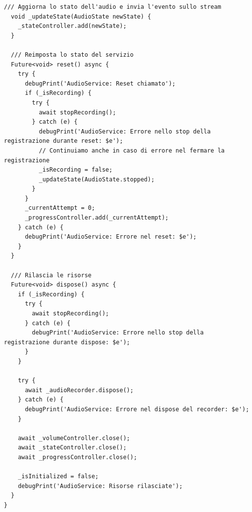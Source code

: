 \documentclass[14pt]{extbook}
\begin{document}
\begin{lstlisting}[caption=audio\_service.dart, label=lst:AudioService]
  /// Aggiorna lo stato dell'audio e invia l'evento sullo stream
  void _updateState(AudioState newState) {
    _stateController.add(newState);
  }

  /// Reimposta lo stato del servizio
  Future<void> reset() async {
    try {
      debugPrint('AudioService: Reset chiamato');
      if (_isRecording) {
        try {
          await stopRecording();
        } catch (e) {
          debugPrint('AudioService: Errore nello stop della registrazione durante reset: $e');
          // Continuiamo anche in caso di errore nel fermare la registrazione
          _isRecording = false;
          _updateState(AudioState.stopped);
        }
      }
      _currentAttempt = 0;
      _progressController.add(_currentAttempt);
    } catch (e) {
      debugPrint('AudioService: Errore nel reset: $e');
    }
  }

  /// Rilascia le risorse
  Future<void> dispose() async {
    if (_isRecording) {
      try {
        await stopRecording();
      } catch (e) {
        debugPrint('AudioService: Errore nello stop della registrazione durante dispose: $e');
      }
    }

    try {
      await _audioRecorder.dispose();
    } catch (e) {
      debugPrint('AudioService: Errore nel dispose del recorder: $e');
    }

    await _volumeController.close();
    await _stateController.close();
    await _progressController.close();

    _isInitialized = false;
    debugPrint('AudioService: Risorse rilasciate');
  }
}

\end{lstlisting}
\pagebreak
\clearpage
\printbibliography %
\clearpage
\end{document}
